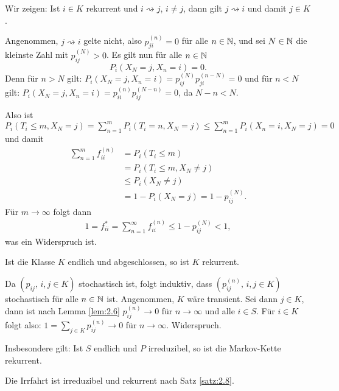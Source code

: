 \documentclass[a4paper,twoside,DIV15,BCOR12mm]{scrbook}
\begin{document}
\begin{beweis}
Wir zeigen: Ist $i\in K$ rekurrent und $i\rightsquigarrow j$, $i\ne j$, dann gilt $j\rightsquigarrow i$ und damit $j\in K$.

Angenommen, $j\rightsquigarrow i$ gelte nicht, also $p_{ji}^{(n)} = 0$ für alle $n\in \mathbb{N}$, und sei $N\in\mathbb{N}$ die kleinste Zahl mit $p_{ij}^{(N)} > 0$. Es gilt nun für alle $n\in \mathbb{N}$
\[
P_i(X_N=j,X_n=i)=0.
\]
Denn für $n>N$ gilt:
$P_i(X_N=j,X_n=i)=p_{ij}^{(N)} p_{ji}^{(n-N)} = 0$ und für $n<N$ gilt: $P_i(X_N=j,X_n=i)=p_{ii}^{(n)} p_{ij}^{(N-n)} = 0$, da $N-n<N$.

Also ist $P_i(T_i\le m,X_N=j) = \sum_{n=1}^m P_i(T_i=n,X_N=j) \le \sum_{n=1}^m P_i(X_n=i, X_N=j) = 0$ und damit 
\begin{align*}
\sum_{n=1}^m f_{ii}^{(n)} 
&= P_i(T_i\le m) \\
&= P_i(T_i\le m, X_N\ne j) \\
&\le P_i(X_N\ne j) \\
&=1-P_i(X_N=j) = 1-p_{ij}^{(N)}.
\end{align*}
Für $m\to\infty$ folgt dann
\begin{align*}
1=f_{ii}^* = \sum_{n=1}^\infty f_{ii}^{(n)}\le 1-p_{ij}^{(N)} < 1,
\end{align*}
was ein Widerspruch ist.
\end{beweis}

\begin{satz}
Ist die Klasse $K$ endlich und abgeschlossen, so ist $K$ rekurrent.\label{satz:2.8}
\end{satz}

\begin{beweis}
Da $(p_{ij},\,i,j\in K)$ stochastisch ist, folgt induktiv, dass $(p_{ij}^{(n)},\, i,j\in K)$ stochastisch für alle $n\in\mathbb{N}$ ist. Angenommen, $K$ wäre transient. Sei dann $j\in K$, dann ist nach Lemma \ref{lem:2.6} $p_{ij}^{(n)}\to 0$ für $n\to\infty$ und alle $i\in S$. Für $i\in K$ folgt also: $1=\sum_{j\in K} p_{ij}^{(n)} \to 0$ für $n\to\infty$. Widerspruch.
\end{beweis}

\begin{bemerkung}
Insbesondere gilt: Ist $S$ endlich und $P$ irreduzibel, so ist die Markov-Kette rekurrent.
\end{bemerkung}

\begin{beispiel}
Die Irrfahrt ist irreduzibel und rekurrent nach Satz \ref{satz:2.8}.
\end{beispiel}
\end{document}
